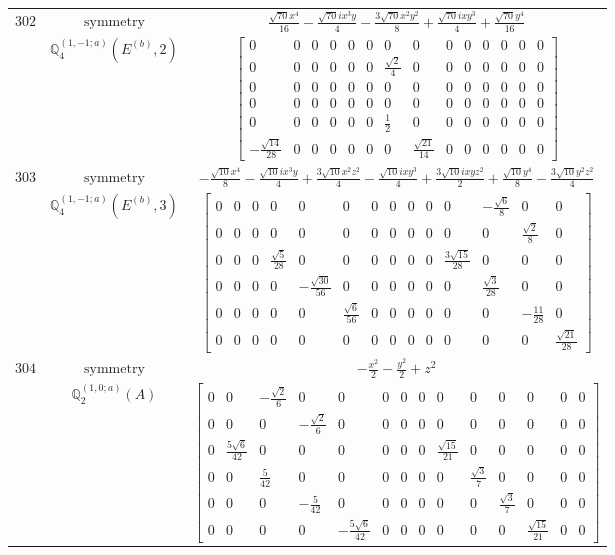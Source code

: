 \documentclass[fleqn,8pt,landscape]{jsarticle}
\begin{document}
\begin{longtable}{ccc}
$ 302 $ & $ \text{symmetry} $ & $ \frac{\sqrt{70} x^{4}}{16} - \frac{\sqrt{70} i x^{3} y}{4} - \frac{3 \sqrt{70} x^{2} y^{2}}{8} + \frac{\sqrt{70} i x y^{3}}{4} + \frac{\sqrt{70} y^{4}}{16} $ \\
$  $ & $ \mathbb{Q}_{4}^{(1,-1;a)}(E^{(b)},2) $ & $ \begin{bmatrix} 0 & 0 & 0 & 0 & 0 & 0 & 0 & 0 & 0 & 0 & 0 & 0 & 0 & 0 \\ 0 & 0 & 0 & 0 & 0 & 0 & \frac{\sqrt{2}}{4} & 0 & 0 & 0 & 0 & 0 & 0 & 0 \\ 0 & 0 & 0 & 0 & 0 & 0 & 0 & 0 & 0 & 0 & 0 & 0 & 0 & 0 \\ 0 & 0 & 0 & 0 & 0 & 0 & 0 & 0 & 0 & 0 & 0 & 0 & 0 & 0 \\ 0 & 0 & 0 & 0 & 0 & 0 & \frac{1}{2} & 0 & 0 & 0 & 0 & 0 & 0 & 0 \\ - \frac{\sqrt{14}}{28} & 0 & 0 & 0 & 0 & 0 & 0 & \frac{\sqrt{21}}{14} & 0 & 0 & 0 & 0 & 0 & 0 \end{bmatrix} $ \\ \hline
$ 303 $ & $ \text{symmetry} $ & $ - \frac{\sqrt{10} x^{4}}{8} - \frac{\sqrt{10} i x^{3} y}{4} + \frac{3 \sqrt{10} x^{2} z^{2}}{4} - \frac{\sqrt{10} i x y^{3}}{4} + \frac{3 \sqrt{10} i x y z^{2}}{2} + \frac{\sqrt{10} y^{4}}{8} - \frac{3 \sqrt{10} y^{2} z^{2}}{4} $ \\
$  $ & $ \mathbb{Q}_{4}^{(1,-1;a)}(E^{(b)},3) $ & $ \begin{bmatrix} 0 & 0 & 0 & 0 & 0 & 0 & 0 & 0 & 0 & 0 & 0 & - \frac{\sqrt{6}}{8} & 0 & 0 \\ 0 & 0 & 0 & 0 & 0 & 0 & 0 & 0 & 0 & 0 & 0 & 0 & \frac{\sqrt{2}}{8} & 0 \\ 0 & 0 & 0 & \frac{\sqrt{5}}{28} & 0 & 0 & 0 & 0 & 0 & 0 & \frac{3 \sqrt{15}}{28} & 0 & 0 & 0 \\ 0 & 0 & 0 & 0 & - \frac{\sqrt{30}}{56} & 0 & 0 & 0 & 0 & 0 & 0 & \frac{\sqrt{3}}{28} & 0 & 0 \\ 0 & 0 & 0 & 0 & 0 & \frac{\sqrt{6}}{56} & 0 & 0 & 0 & 0 & 0 & 0 & - \frac{11}{28} & 0 \\ 0 & 0 & 0 & 0 & 0 & 0 & 0 & 0 & 0 & 0 & 0 & 0 & 0 & \frac{\sqrt{21}}{28} \end{bmatrix} $ \\ \hline
$ 304 $ & $ \text{symmetry} $ & $ - \frac{x^{2}}{2} - \frac{y^{2}}{2} + z^{2} $ \\
$  $ & $ \mathbb{Q}_{2}^{(1,0;a)}(A) $ & $ \begin{bmatrix} 0 & 0 & - \frac{\sqrt{2}}{6} & 0 & 0 & 0 & 0 & 0 & 0 & 0 & 0 & 0 & 0 & 0 \\ 0 & 0 & 0 & - \frac{\sqrt{2}}{6} & 0 & 0 & 0 & 0 & 0 & 0 & 0 & 0 & 0 & 0 \\ 0 & \frac{5 \sqrt{6}}{42} & 0 & 0 & 0 & 0 & 0 & 0 & \frac{\sqrt{15}}{21} & 0 & 0 & 0 & 0 & 0 \\ 0 & 0 & \frac{5}{42} & 0 & 0 & 0 & 0 & 0 & 0 & \frac{\sqrt{3}}{7} & 0 & 0 & 0 & 0 \\ 0 & 0 & 0 & - \frac{5}{42} & 0 & 0 & 0 & 0 & 0 & 0 & \frac{\sqrt{3}}{7} & 0 & 0 & 0 \\ 0 & 0 & 0 & 0 & - \frac{5 \sqrt{6}}{42} & 0 & 0 & 0 & 0 & 0 & 0 & \frac{\sqrt{15}}{21} & 0 & 0 \end{bmatrix} $ \\ \hline

\end{longtable}
\end{document}
